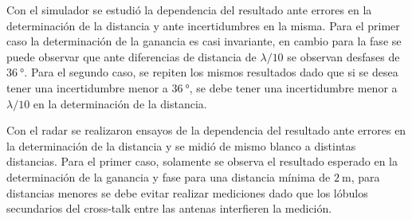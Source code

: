 Con el simulador se estudió la dependencia del resultado ante errores en la determinación de la distancia y ante incertidumbres en la misma. Para el primer caso la determinación de la ganancia es casi invariante, en cambio para la fase se puede observar que ante diferencias de distancia de $\lambda / 10$ se observan desfases de $\SI{36}{\degree}$. Para el segundo caso, se repiten los mismos resultados dado que si se desea tener una incertidumbre menor a $\SI{36}{\degree}$, se debe tener una incertidumbre menor a $\lambda / 10$ en la determinación de la distancia.

Con el radar se realizaron ensayos de la dependencia del resultado ante errores en la determinación de la distancia y se midió de mismo blanco a distintas distancias. Para el primer caso, solamente se observa el resultado esperado en la determinación de la ganancia y fase para una distancia mínima de $\SI{2}{\meter}$, para distancias menores se debe evitar realizar mediciones dado que los lóbulos secundarios del cross-talk entre las antenas interfieren la medición.